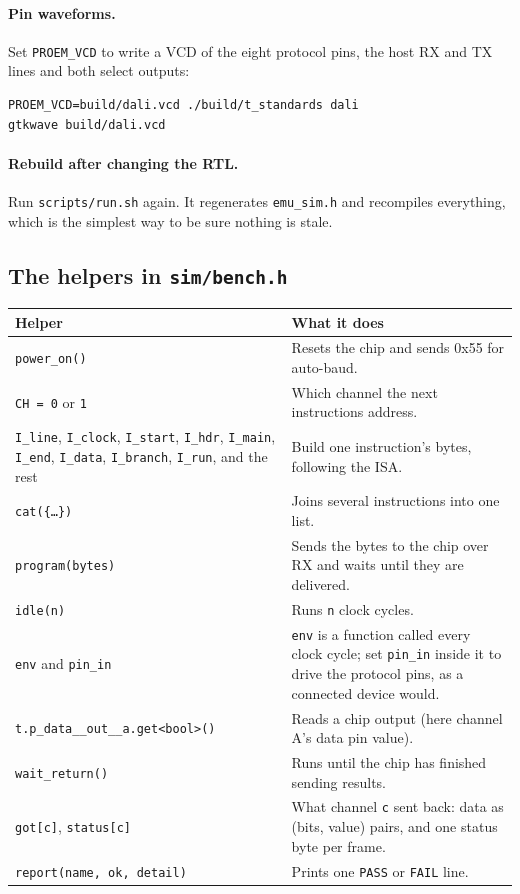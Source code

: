 \documentclass[11pt,a4paper]{article}
\newcommand{\file}[1]{\texttt{#1}}
\begin{document}
\paragraph{Pin waveforms.} Set \texttt{PROEM\_VCD} to write a VCD of the eight protocol pins, the host RX and TX lines and both select outputs:
\begin{lstlisting}
PROEM_VCD=build/dali.vcd ./build/t_standards dali
gtkwave build/dali.vcd
\end{lstlisting}

\paragraph{Rebuild after changing the RTL.} Run \file{scripts/run.sh} again. It regenerates \file{emu\_sim.h} and recompiles everything, which is the simplest way to be sure nothing is stale.

\subsection{The helpers in \file{sim/bench.h}}

\begin{center}
\begin{tabularx}{\linewidth}{@{}>{\raggedright\arraybackslash}p{5.7cm}L@{}}
\toprule
Helper & What it does \\
\midrule
\texttt{power\_on()} & Resets the chip and sends 0x55 for auto-baud. \\
\texttt{CH = 0} or \texttt{1} & Which channel the next instructions address. \\
\texttt{I\_line}, \texttt{I\_clock}, \texttt{I\_start}, \texttt{I\_hdr}, \texttt{I\_main}, \texttt{I\_end}, \texttt{I\_data}, \texttt{I\_branch}, \texttt{I\_run}, and the rest & Build one instruction's bytes, following the ISA. \\
\texttt{cat(\{\ldots\})} & Joins several instructions into one list. \\
\texttt{program(bytes)} & Sends the bytes to the chip over RX and waits until they are delivered. \\
\texttt{idle(n)} & Runs \texttt{n} clock cycles. \\
\texttt{env} and \texttt{pin\_in} & \texttt{env} is a function called every clock cycle; set \texttt{pin\_in} inside it to drive the protocol pins, as a connected device would. \\
\texttt{t.p\_data\_\_out\_\_a.get<bool>()} & Reads a chip output (here channel A's data pin value). \\
\texttt{wait\_return()} & Runs until the chip has finished sending results. \\
\texttt{got[c]}, \texttt{status[c]} & What channel \texttt{c} sent back: data as (bits, value) pairs, and one status byte per frame. \\
\texttt{report(name, ok, detail)} & Prints one \texttt{PASS} or \texttt{FAIL} line. \\
\bottomrule
\end{tabularx}
\end{center}
\end{document}
